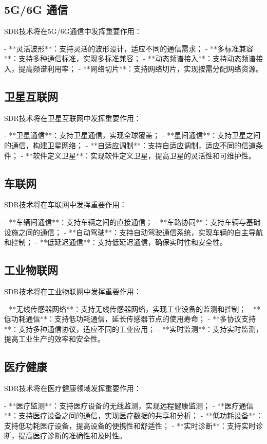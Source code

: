 ﻿\documentclass[UTF8]{ctexbook}
\begin{document}
\subsection{5G/6G 通信}

SDR技术将在5G/6G通信中发挥重要作用：

- **灵活波形**：支持灵活的波形设计，适应不同的通信需求；
- **多标准兼容**：支持多种通信标准，实现多标准兼容；
- **动态频谱接入**：支持动态频谱接入，提高频谱利用率；
- **网络切片**：支持网络切片，实现按需分配网络资源。

\subsection{卫星互联网}

SDR技术将在卫星互联网中发挥重要作用：

- **卫星通信**：支持卫星通信，实现全球覆盖；
- **星间通信**：支持卫星之间的通信，构建卫星网络；
- **自适应调制**：支持自适应调制，适应不同的信道条件；
- **软件定义卫星**：实现软件定义卫星，提高卫星的灵活性和可维护性。

\subsection{车联网}

SDR技术将在车联网中发挥重要作用：

- **车辆间通信**：支持车辆之间的直接通信；
- **车路协同**：支持车辆与基础设施之间的通信；
- **自动驾驶**：支持自动驾驶通信系统，实现车辆的自主导航和控制；
- **低延迟通信**：支持低延迟通信，确保实时性和安全性。

\subsection{工业物联网}

SDR技术将在工业物联网中发挥重要作用：

- **无线传感器网络**：支持无线传感器网络，实现工业设备的监测和控制；
- **低功耗通信**：支持低功耗通信，延长传感器节点的使用寿命；
- **多协议支持**：支持多种通信协议，适应不同的工业应用；
- **实时监测**：支持实时监测，提高工业生产的效率和安全性。

\subsection{医疗健康}

SDR技术将在医疗健康领域发挥重要作用：

- **医疗监测**：支持医疗设备的无线监测，实现远程健康监测；
- **医疗通信**：支持医疗设备之间的通信，实现医疗数据的共享和分析；
- **低功耗设备**：支持低功耗医疗设备，提高设备的便携性和舒适性；
- **实时诊断**：支持实时诊断，提高医疗诊断的准确性和及时性。
\end{document}
